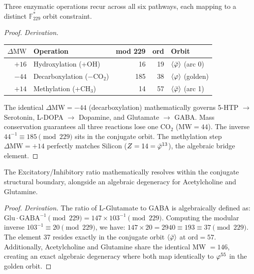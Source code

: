 \begin{theorem}
Three enzymatic operations recur across all six pathways, each mapping to a distinct $\mathbb{F}_{229}^*$ orbit constraint.
\begin{proof}
\emph{Derivation.}
\begin{center}
\begin{tabular}{@{}rlrrl@{}}
\toprule
$\Delta\mathrm{MW}$ & \textbf{Operation} & \textbf{mod 229} & \textbf{ord} & \textbf{Orbit} \\
\midrule
$+16$ & Hydroxylation (+OH) & 16 & 19 & $\langle\bar{\varphi}\rangle$ (arc 0) \\
$-44$ & Decarboxylation ($-\mathrm{CO}_2$) & 185 & 38 & $\langle\varphi\rangle$ (golden) \\
$+14$ & Methylation (+$\mathrm{CH}_3$) & 14 & 57 & $\langle\bar{\varphi}\rangle$ (arc 1) \\
\bottomrule
\end{tabular}
\end{center}
The identical $\Delta\mathrm{MW} = -44$ (decarboxylation) mathematically governs 5-HTP $\to$ Serotonin, L-DOPA $\to$ Dopamine, and Glutamate $\to$ GABA. Mass conservation guarantees all three reactions lose one CO$_2$ ($\mathrm{MW} = 44$). The inverse $44^{-1} \equiv 185 \pmod{229}$ sits in the conjugate orbit. The methylation step $\Delta\mathrm{MW} = +14$ perfectly matches Silicon ($Z = 14 = \bar{\varphi}^{13}$), the algebraic bridge element.
\qedhere
\end{proof}
\end{theorem}

\begin{theorem}
The Excitatory/Inhibitory ratio mathematically resolves within the conjugate structural boundary, alongside an algebraic degeneracy for Acetylcholine and Glutamine.
\begin{proof}
\emph{Derivation.} The ratio of L-Glutamate to GABA is algebraically defined as:
$\mathrm{Glu} \cdot \mathrm{GABA}^{-1} \pmod{229} = 147 \times 103^{-1} \pmod{229}$.
Computing the modular inverse $103^{-1} \equiv 20 \pmod{229}$, we have:
$147 \times 20 = 2940 \equiv 193 \equiv 37 \pmod{229}$.
The element 37 resides exactly in the conjugate orbit $\langle\bar{\varphi}\rangle$ at $\mathrm{ord} = 57$. Additionally, Acetylcholine and Glutamine share the identical MW $= 146$, creating an exact algebraic degeneracy where both map identically to $\varphi^{55}$ in the golden orbit.
\qedhere
\end{proof}
\end{theorem}


